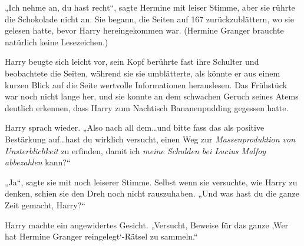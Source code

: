 
„Ich nehme an, du hast recht“, sagte Hermine mit leiser Stimme, aber sie rührte die Schokolade nicht an. Sie begann, die Seiten auf 167 zurückzublättern, wo sie gelesen hatte, bevor Harry hereingekommen war. (Hermine Granger brauchte natürlich keine Lesezeichen.)

Harry beugte sich leicht vor, sein Kopf berührte fast ihre Schulter und beobachtete die Seiten, während sie sie umblätterte, als könnte er aus einem kurzen Blick auf die Seite wertvolle Informationen herauslesen. Das Frühstück war noch nicht lange her, und sie konnte an dem schwachen Geruch seines Atems deutlich erkennen, dass Harry zum Nachtisch Bananenpudding gegessen hatte.

Harry sprach wieder. „Also nach all dem…und bitte fass das als positive Bestärkung auf…hast du wirklich versucht, einen Weg zur \emph{Massenproduktion von Unsterblichkeit} zu erfinden, damit ich \emph{meine Schulden bei Lucius Malfoy abbezahlen} kann?“

„Ja“, sagte sie mit noch leiserer Stimme. Selbst wenn sie versuchte, wie Harry zu denken, schien sie den Dreh noch nicht rauszuhaben. „Und was hast du die ganze Zeit gemacht, Harry?“

Harry machte ein angewidertes Gesicht. „Versucht, Beweise für das ganze ‚Wer hat Hermine Granger reingelegt‘-Rätsel zu sammeln.“

